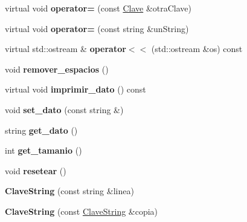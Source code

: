 \begin{DoxyCompactItemize}
\item 
\hypertarget{class_clave_string_aa2621d39c9398eacdba6a02f0cf45cf3}{virtual void {\bfseries operator=} (const \hyperlink{class_clave}{\-Clave} \&otra\-Clave)}\label{class_clave_string_aa2621d39c9398eacdba6a02f0cf45cf3}

\item 
\hypertarget{class_clave_string_add07e86450333c3c80e0cfc2e611edd1}{virtual void {\bfseries operator=} (const string \&un\-String)}\label{class_clave_string_add07e86450333c3c80e0cfc2e611edd1}

\item 
\hypertarget{class_clave_string_ad716ebd9e8359514d0d2ec2b2301e762}{virtual std\-::ostream \& {\bfseries operator$<$$<$} (std\-::ostream \&os) const }\label{class_clave_string_ad716ebd9e8359514d0d2ec2b2301e762}

\item 
\hypertarget{class_clave_string_ad2a5735db579e0e089bbaafdce2879c3}{void {\bfseries remover\-\_\-espacios} ()}\label{class_clave_string_ad2a5735db579e0e089bbaafdce2879c3}

\item 
\hypertarget{class_clave_string_a5fb868c4a9f19bda99f2814b6f8db046}{virtual void {\bfseries imprimir\-\_\-dato} () const }\label{class_clave_string_a5fb868c4a9f19bda99f2814b6f8db046}

\item 
\hypertarget{class_clave_string_a67ae9944aee7678fbd16a83ad6ecc890}{void {\bfseries set\-\_\-dato} (const string \&)}\label{class_clave_string_a67ae9944aee7678fbd16a83ad6ecc890}

\item 
\hypertarget{class_clave_string_a37d169838345a3e5a330c3e8ffe5976f}{string {\bfseries get\-\_\-dato} ()}\label{class_clave_string_a37d169838345a3e5a330c3e8ffe5976f}

\item 
\hypertarget{class_clave_string_a29492ee35ff9e28721f8f441bcbbda70}{int {\bfseries get\-\_\-tamanio} ()}\label{class_clave_string_a29492ee35ff9e28721f8f441bcbbda70}

\item 
\hypertarget{class_clave_string_a16a864be5647aa3554579d9fa5e3e82c}{void {\bfseries resetear} ()}\label{class_clave_string_a16a864be5647aa3554579d9fa5e3e82c}

\item 
\hypertarget{class_clave_string_a5750f58714f4d901170fac4a100a5b66}{{\bfseries \-Clave\-String} (const string \&linea)}\label{class_clave_string_a5750f58714f4d901170fac4a100a5b66}

\item 
\hypertarget{class_clave_string_ae3074c0ba40493a3338796c908a09b7a}{{\bfseries \-Clave\-String} (const \hyperlink{class_clave_string}{\-Clave\-String} \&copia)}\label{class_clave_string_ae3074c0ba40493a3338796c908a09b7a}

\end{DoxyCompactItemize}
